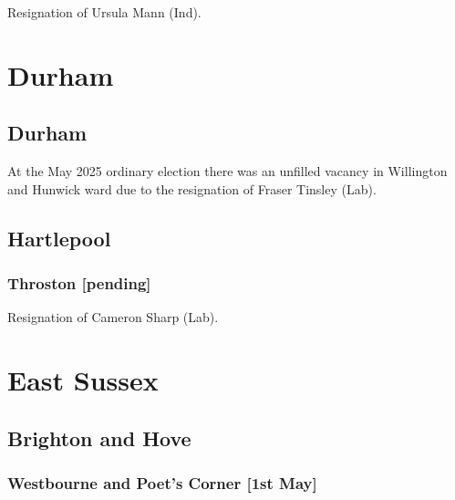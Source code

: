 \documentclass[a4paper,openany]{book}
\begin{document}
\begin{resultsiii}

Resignation of Ursula Mann (Ind).

\section{Durham}

\subsection*{Durham}

At the May 2025 ordinary election there was an unfilled vacancy in Willington and Hunwick ward due to the resignation of Fraser Tinsley (Lab).%

\subsection*{Hartlepool}

\subsubsection*{Throston \hspace*{\fill}\nolinebreak[1]%
	\enspace\hspace*{\fill}
	[pending]}


Resignation of Cameron Sharp (Lab).

\section{East Sussex}

\subsection*{Brighton and Hove}

\subsubsection*{Westbourne and Poet's Corner \hspace*{\fill}\nolinebreak[1]%
	\enspace\hspace*{\fill}
	[1st May]}



\end{resultsiii}
\end{document}
